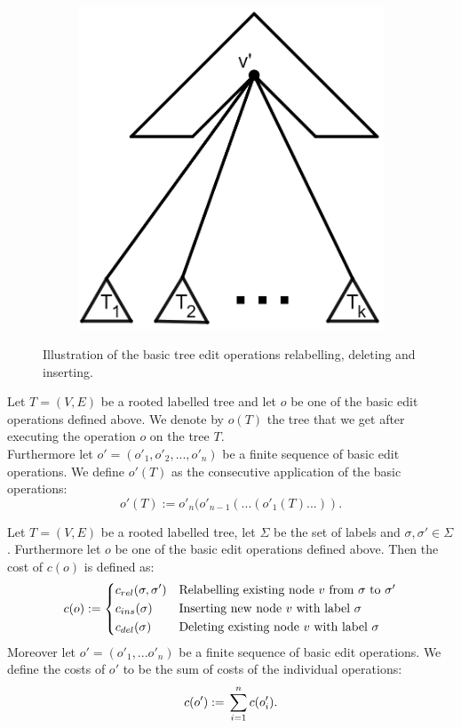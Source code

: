 \begin{figure}[b]
\begin{subfigure}[b]{0.18\textwidth}
    \end{subfigure}
    \begin{subfigure}[b]{0.18\textwidth}
	\caption{}
	\includegraphics[width=\textwidth]{figures/TreeEditOperation_3.png}
    \end{subfigure}
	\caption{Illustration of the basic tree edit operations relabelling, deleting and inserting.}\label{fig:heavypath}
\end{figure}
\begin{defin}
Let $T=(V,E)$ be a rooted labelled tree and let $o$ be one of the basic edit operations defined above. We denote by $o(T)$ the tree that we get after executing the operation $o$ on the tree $T$. \\
Furthermore let $o'=(o'_1,o'_2,...,o'_n)$ be a finite sequence of basic edit operations. We define $o'(T)$ as the consecutive application of the basic operations:
$$o'(T) := o'_n(o'_{n-1}(...(o'_1(T)...)).$$
\end{defin}
\begin{defin}
Let $T=(V,E)$ be a rooted labelled tree, let $\Sigma$ be the set of labels and $\sigma, \sigma' \in \Sigma$. Furthermore let $o$ be one of the basic edit operations defined above. Then the cost of $c(o)$ is defined as:
\[
c(o) :=
\begin{dcases*}
        c_{rel}(\sigma, \sigma')  & Relabelling existing node $v$ from $\sigma$ to $\sigma'$\\
        c_{ins}(\sigma) & Inserting new node $v$ with label $\sigma$ \\
        c_{del}(\sigma) & Deleting existing node $v$ with label $\sigma$
\end{dcases*} 
\]
Moreover let $o'=(o'_1,...o'_n)$ be a finite sequence of basic edit operations. We define the costs of $o'$ to be the sum of costs of the individual operations:
$$c(o') := \sideset{}{}\sum_{i=1}^n c(o'_i).$$
\end{defin}
